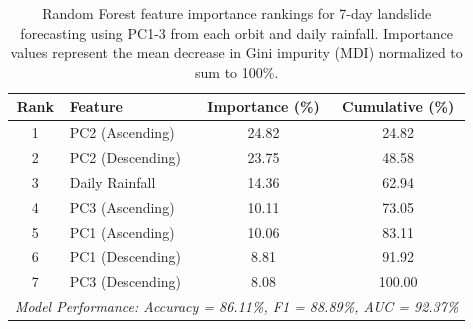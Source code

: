 \begin{table}[htbp]
\centering
\caption{Random Forest feature importance rankings for 7-day landslide forecasting using PC1-3 from each orbit and daily rainfall. Importance values represent the mean decrease in Gini impurity (MDI) normalized to sum to 100\%.}
\label{tab:feature_importance}
\begin{tabular}{clcc}
\toprule
\textbf{Rank} & \textbf{Feature} & \textbf{Importance (\%)} & \textbf{Cumulative (\%)} \\
\midrule
1 & PC2 (Ascending) & 24.82 & 24.82 \\
2 & PC2 (Descending) & 23.75 & 48.58 \\
3 & Daily Rainfall & 14.36 & 62.94 \\
4 & PC3 (Ascending) & 10.11 & 73.05 \\
5 & PC1 (Ascending) & 10.06 & 83.11 \\
6 & PC1 (Descending) & 8.81 & 91.92 \\
7 & PC3 (Descending) & 8.08 & 100.00 \\
\midrule
\multicolumn{4}{l}{\textit{Model Performance: Accuracy = 86.11\%, F1 = 88.89\%, AUC = 92.37\%}} \\
\bottomrule
\end{tabular}
\end{table}
